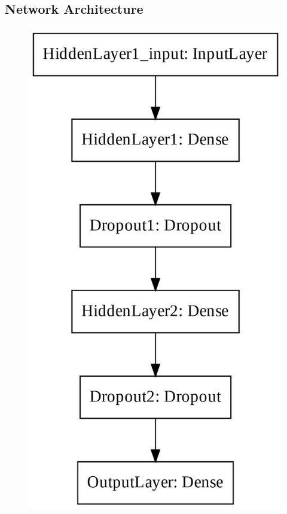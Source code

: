 \subsection{Network Architecture}\label{ch5:ann_structure}
\begin{figure}[!htp]
\centering
\begin{minipage}[b][][b]{.35\linewidth}
    \includegraphics[width=\linewidth]{templates/images/Figure-TF_NN_Structure.png}

\end{minipage}
\end{figure}

